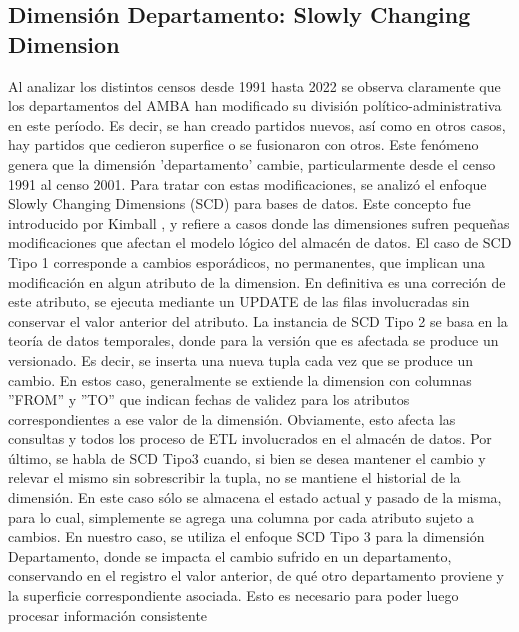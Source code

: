 \documentclass{article}
\theoremstyle{mytheoremstyle}
\theoremstyle{mytheoremstyle}
\theoremstyle{myproblemstyle}
\begin{document}
 \subsection{Dimensión Departamento: Slowly Changing Dimension }
 Al analizar los distintos censos desde 1991 hasta 2022 se observa claramente que los departamentos del 
 AMBA han modificado su división político-administrativa en este período.
 Es decir, se han creado partidos nuevos, así como en otros casos, hay partidos que cedieron superfice o se fusionaron con otros.
 Este fenómeno genera que la dimensión 'departamento' cambie, particularmente desde el censo 1991 al censo 2001.\newline\newline
 Para tratar con estas modificaciones, se analizó el enfoque Slowly Changing Dimensions (SCD) para bases de datos. 
Este concepto fue introducido por Kimball , y refiere a casos donde las dimensiones sufren pequeñas 
modificaciones que afectan el modelo lógico del almacén de datos.\newline\newline
El caso de SCD Tipo 1 corresponde a cambios esporádicos, no permanentes, que implican una modificación en algun atributo de la dimension. 
En definitiva es una correción de este atributo, se ejecuta mediante un UPDATE de las filas involucradas sin conservar el valor anterior del atributo.
  La instancia de SCD Tipo 2 se basa en la teoría de datos temporales, donde para la versión que es afectada se produce un versionado.
  Es decir, se inserta una nueva tupla cada vez que se produce un cambio. En estos caso, generalmente se extiende la dimension con columnas
   ''FROM'' y ''TO'' que indican  fechas de validez para los atributos correspondientes a ese valor de la dimensión. Obviamente, esto afecta las consultas
 y todos los proceso  de ETL involucrados en el almacén de datos.  Por último, se habla de  SCD Tipo3 cuando, si bien se desea mantener el cambio y 
  relevar el mismo sin sobrescribir la tupla, no se mantiene el historial de la dimensión. En este caso sólo se almacena el estado actual y pasado de la misma,
para lo cual, simplemente se agrega una columna por cada atributo sujeto a cambios.\newline\newline
  En nuestro caso, se utiliza el enfoque SCD Tipo 3 para la dimensión Departamento, donde se impacta el cambio sufrido en un departamento, conservando 
en el registro el valor anterior, de qué otro departamento proviene y la superficie correspondiente asociada. Esto es necesario para poder luego procesar información consistente 
\end{document}
